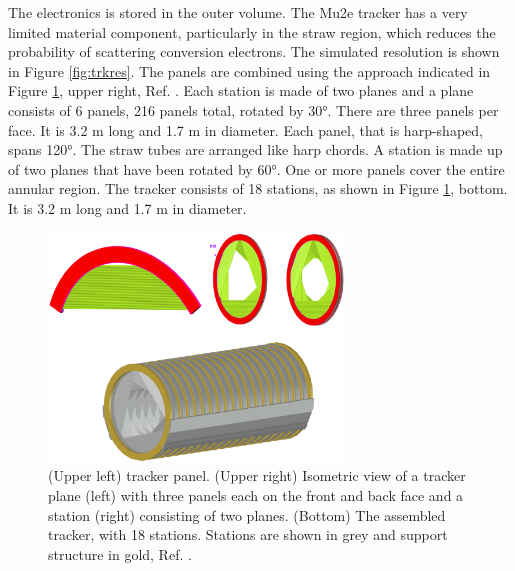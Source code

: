 The electronics is stored in the outer volume. The Mu2e tracker has a very limited material component, 
particularly in the straw region, which reduces the probability of scattering conversion 
electrons. The simulated resolution is shown in Figure \ref{fig:trkres}. 
The panels are combined 
using the approach indicated in Figure \ref{fig:trkpanel}, upper right, 
Ref. \cite{trk}.  Each station is made of two planes and a plane consists of 6 panels, 
216 panels total, rotated by 30°. There are three panels per face. It is 3.2 m long and 1.7 m in diameter. 
Each panel, that is harp-shaped, spans 120°. The straw tubes are arranged like harp chords. 
A station is made up of two planes that have been rotated by 60°. One or more panels cover the entire annular 
region. The tracker consists of 18 stations, as shown in 
Figure \ref{fig:trkpanel}, bottom. It is 3.2 m long and 1.7 m in diameter. 
\begin{figure}[!h]
\centering
\includegraphics[width =0.7\textwidth]{figures/png/Screenshot_20240306_222803.png}
\caption{(Upper left) tracker panel. (Upper right) Isometric view 
of a tracker plane (left) with three panels each on the front and 
back face and a station (right) consisting of two planes. (Bottom) 
The assembled tracker, with 18 stations. Stations are shown in 
grey and support structure in gold, Ref. \cite{bartoszek2015mu2e}.}
\label{fig:trkpanel}
\end{figure}
